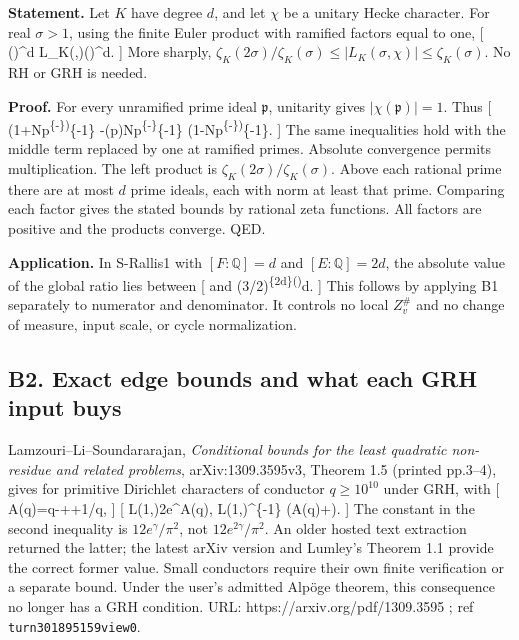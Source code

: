\documentclass[11pt,a4paper]{article}
\theoremstyle{definition}
\begin{document}
\textbf{Statement.} Let \(K\) have degree \(d\), and let \(\chi\) be a
unitary Hecke character. For real \(\sigma>1\), using the finite Euler
product with ramified factors equal to one, {[}
\left(\frac{\zeta(2\sigma)}{\zeta(\sigma)}\right)\^{}d
\leq \textbar L\_K(\sigma,\chi)\textbar{}\leq \zeta(\sigma)\^{}d. {]}
More sharply,
\(\zeta_K(2\sigma)/\zeta_K(\sigma)\leq|L_K(\sigma,\chi)|\leq\zeta_K(\sigma)\).
No RH or GRH is needed.

\textbf{Proof.} For every unramified prime ideal \(\mathfrak p\),
unitarity gives \(|\chi(\mathfrak p)|=1\). Thus {[}
(1+N\mathfrak p\textsuperscript{\{-\sigma\})}\{-1\}\leq
{}-\chi(\mathfrak p)N\mathfrak p\textsuperscript{\{-\sigma\}\textbar{}}\{-1\}
\leq(1-N\mathfrak p\textsuperscript{\{-\sigma\})}\{-1\}. {]} The same
inequalities hold with the middle term replaced by one at ramified
primes. Absolute convergence permits multiplication. The left product is
\(\zeta_K(2\sigma)/\zeta_K(\sigma)\). Above each rational prime there
are at most \(d\) prime ideals, each with norm at least that prime.
Comparing each factor gives the stated bounds by rational zeta
functions. All factors are positive and the products converge. QED.

\textbf{Application.} In S-Rallis1 with \([F:\mathbb Q]=d\) and
\([E:\mathbb Q]=2d\), the absolute value of the global ratio lies
between {[}  \quad\hbox{and}\quad
\zeta(3/2)\textsuperscript{\{2d\}\left(\right)}d.
{]} This follows by applying B1 separately to numerator and denominator.
It controls no local \(Z_v^\#\) and no change of measure, input scale,
or cycle normalization.

\subsection{B2. Exact edge bounds and what each GRH input
buys}\label{b2.-exact-edge-bounds-and-what-each-grh-input-buys}

Lamzouri--Li--Soundararajan, \emph{Conditional bounds for the least
quadratic non-residue and related problems}, arXiv:1309.3595v3, Theorem
1.5 (printed pp.3--4), gives for primitive Dirichlet characters of
conductor \(q\geq10^{10}\) under GRH, with {[}
A(q)=\log\log q-++1/\log\log q, {]} {[}
\textbar L(1,\chi)\textbar{}\leq 2e\^{}\gamma A(q),\qquad
\textbar L(1,\chi)\textbar\^{}\{-1\}\leq{}
\left(A(q)+\right). {]} The constant in the
second inequality is \(12e^\gamma/\pi^2\), not \(12e^{2\gamma}/\pi^2\).
An older hosted text extraction returned the latter; the latest arXiv
version and Lumley's Theorem 1.1 provide the correct former value. Small
conductors require their own finite verification or a separate bound.
Under the user's admitted Alpöge theorem, this consequence no longer has
a GRH condition. URL: https://arxiv.org/pdf/1309.3595 ; ref
\texttt{turn301895159view0}.
\end{document}
